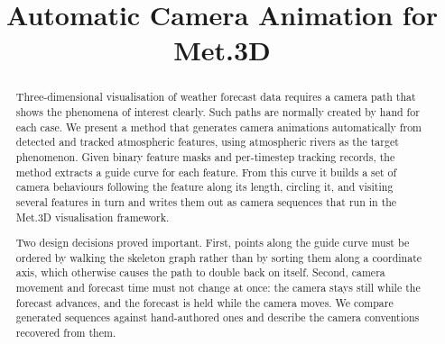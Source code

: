 \documentclass[gmd, manuscript]{copernicus}
\begin{document}
\title{Automatic Camera Animation for Met.3D}





\received{}
\pubdiscuss{}
\revised{}
\accepted{}
\published{}


\maketitle

\begin{abstract}
Three-dimensional visualisation of weather forecast data requires a
camera path that shows the phenomena of interest clearly. Such paths are
normally created by hand for each case. We present a method that
generates camera animations automatically from detected and tracked
atmospheric features, using atmospheric rivers as the target phenomenon.
Given binary feature masks and per-timestep tracking records, the method
extracts a guide curve for each feature. From this curve it builds a set
of camera behaviours following the feature along its length, circling
it, and visiting several features in turn and writes them out as
camera sequences that run in the Met.3D visualisation framework.

Two design decisions proved important. First, points along the guide
curve must be ordered by walking the skeleton graph rather than by
sorting them along a coordinate axis, which otherwise causes the path to
double back on itself. Second, camera movement and forecast time must not
change at once: the camera stays still while the forecast advances, and
the forecast is held while the camera moves. We compare generated
sequences against hand-authored ones and describe the camera conventions
recovered from them.
\end{abstract}

\introduction
\end{document}

